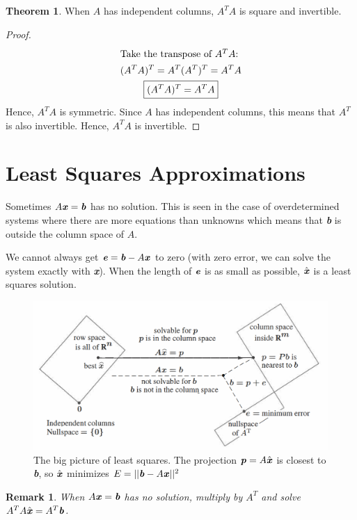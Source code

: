 \documentclass[12pt, letterpaper]{article}
\newcommand{\V}[1]{\textbf{\textit{#1}}}
\newcommand{\DefinitionSpace}{\vspace{15px}}
\newtheorem*{remark}{Remark}
\theoremstyle{definition}
\newtheorem{theorem}{Theorem}
\begin{document}
		\DefinitionSpace
		\begin{theorem}
			When $A$ has independent columns, $A^T A$ is square and invertible.
		\end{theorem}
		\begin{proof}
			\begin{gather*}
				\intertext{Take the transpose of $A^T A$:}
					(A^T A)^T = A^T (A^T)^T = A^T A \\
					\boxed{(A^T A)^T = A^T A}
			\end{gather*}
			Hence, $A^T A$ is symmetric. Since $A$ has independent columns, this means that $A^T$ is also invertible. Hence, $A^T A$ is invertible.
		\end{proof}



\section{Least Squares Approximations}
	Sometimes $A\V{x} = \V{b}$ has no solution. This is seen in the case of overdetermined systems where there are more equations than unknowns which means that \V{b} is outside the column space of $A$. 
	
	We cannot always get $\V{e} = \V{b} - A\V{x}$ to zero (with zero error, we can solve the system exactly with \V{x}). When the length of $\V{e}$ is as small as possible, $\hat{\V{x}}$ is a least squares solution. 
	
	
	\begin{figure}[h!]
		\centering
		\includegraphics[scale=0.4]{big_picture_ls.png}
		\caption{The big picture of least squares. The projection $\V{p} = A \hat{\V{x}}$ is closest to \V{b}, so $\hat{\V{x}}$ minimizes $E = ||\V{b} - A\V{x}||^2$}
		\label{LSbigpicture}
	\end{figure}
	
	
	\begin{remark}
		When $A\V{x} = \V{b}$ has no solution, multiply by $A^T$ and solve $A^T A \hat{\V{x}} = A^T \V{b}$.
	\end{remark}
\end{document}

